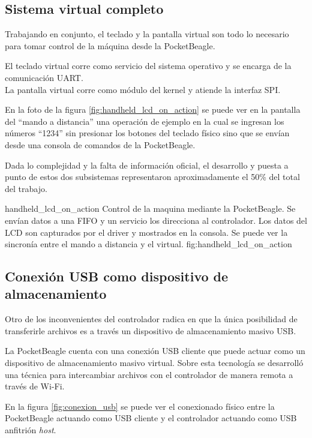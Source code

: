 \subsection{Sistema virtual completo}
      Trabajando en conjunto, el teclado y la pantalla virtual son todo lo necesario para tomar control de la máquina desde la PocketBeagle.\par
      El teclado virtual corre como servicio del sistema operativo y se encarga de la comunicación UART.\\
      La pantalla virtual corre como módulo del kernel y atiende la interfaz SPI.\par

      En la foto de la figura \ref{fig:handheld_lcd_on_action} se puede ver en la pantalla del ``mando a distancia'' una operación de ejemplo en la cual se ingresan los números ``1234'' sin presionar los botones del teclado físico sino que se envían desde una consola de comandos de la PocketBeagle.\par
      Dada lo complejidad y la falta de información oficial, el desarrollo y puesta a punto de estos dos subsistemas representaron aproximadamente el 50\% del total del trabajo.\par

         {handheld_lcd_on_action}
         {Control de la maquina mediante la PocketBeagle. Se envían datos a una FIFO y un servicio los direcciona al controlador. Los datos del LCD son capturados por el driver y mostrados en la consola. Se puede ver la sincronía entre el mando a distancia y el virtual.}
         {fig:handheld_lcd_on_action}


\subsection{Conexión USB como dispositivo de almacenamiento}
   Otro de los inconvenientes del controlador radica en que la única posibilidad de transferirle archivos es a través un dispositivo de almacenamiento masivo USB.\par
   La PocketBeagle cuenta con una conexión USB cliente que puede actuar como un dispositivo de almacenamiento masivo virtual.
   Sobre esta tecnología se desarrolló una técnica para intercambiar archivos con el controlador de manera remota a través de Wi-Fi.\par
   En la figura \ref{fig:conexion_usb} se puede ver el conexionado físico entre la PocketBeagle actuando como USB cliente y el controlador actuando como USB anfitrión \textit{host}.

